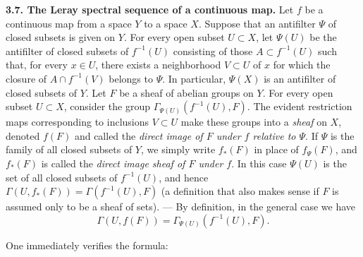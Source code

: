 \indent\textbf{3.7. The Leray spectral sequence of a continuous map.} Let $f$ be a
continuous map from a space $Y$ to a space $X$.
Suppose that an antifilter $\Psi$ of closed subsets is given on $Y$. For every
open subset $U\subset X$, let $\Psi(U)$ be the antifilter of closed subsets
of $f^{-1}(U)$ consisting of those $A\subset f^{-1}(U)$ such that, for every
$x\in U$, there exists a neighborhood $V\subset U$ of $x$ for which the
closure of $A\cap f^{-1}(V)$ belongs to $\Psi$. In particular, $\Psi(X)$ is
an antifilter of closed subsets of $Y$.
Let $F$ be a sheaf of abelian groups on $Y$. For every open subset
$U\subset X$, consider the group $\Gamma_{\Psi(U)}(f^{-1}(U),F)$. The evident
restriction maps corresponding to inclusions $V\subset U$ make these groups
into a \textit{sheaf} on $X$, denoted $f(F)$ and called the \textit{direct image
of $F$ under $f$ relative to $\Psi$}.
If $\Psi$ is the family of all closed subsets of $Y$, we simply write
$f_*(F)$ in place of $f_\Psi(F)$, and $f_*(F)$ is called the \textit{direct
image sheaf of $F$ under $f$}. In this case $\Psi(U)$ is the set of all closed
subsets of $f^{-1}(U)$, and hence
$\Gamma(U,f_*(F))=\Gamma(f^{-1}(U),F)$
(a definition that also makes sense if $F$ is assumed only to be a sheaf of
sets). --- By definition, in the general case we have
\[
\Gamma(U,f(F))=\Gamma_{\Psi(U)}(f^{-1}(U),F).
\]

One immediately verifies the formula:

